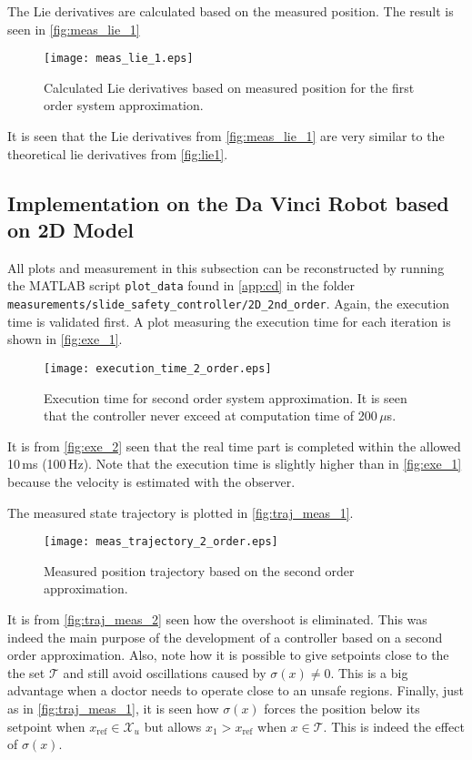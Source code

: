 The Lie derivatives are calculated based on the measured position. The result is seen in \autoref{fig:meas_lie_1}
\begin{figure}[H]
	\center
		\texttt{[image: meas\_lie\_1.eps]}
	\caption{Calculated Lie derivatives based on measured position for the first order system approximation. }
    \label{fig:meas_lie_1}
\end{figure}
It is seen that the Lie derivatives from \autoref{fig:meas_lie_1} are very similar to the theoretical lie derivatives from \autoref{fig:lie1}.
\subsection{Implementation on the Da Vinci Robot based on 2D Model}\label{subsec-implement-2dmodel}
All plots and measurement in this subsection can be reconstructed by running the MATLAB script \texttt{plot\_data} found in \autoref{app:cd} in the folder \texttt{measurements/slide\_safety\_controller/2D\_2nd\_order}. Again, the execution time is validated first. A plot measuring the execution time for each iteration is shown in \autoref{fig:exe_1}.
\begin{figure}[H]
	\center
		\texttt{[image: execution\_time\_2\_order.eps]}
	\caption{Execution time for second order system approximation. It is seen that the controller never exceed at computation time of 200\,$\mu$s.}
	\label{fig:exe_2}
\end{figure}
It is from \autoref{fig:exe_2} seen that the real time part is completed within the allowed 10\,ms (100\,Hz). Note that the execution time is slightly higher than in \autoref{fig:exe_1} because the velocity is estimated with the observer.

The measured state trajectory is plotted in \autoref{fig:traj_meas_1}.
\begin{figure}[H]
	\center
		\texttt{[image: meas\_trajectory\_2\_order.eps]}
	\caption{Measured position trajectory based on the second order approximation.}
    \label{fig:traj_meas_2}
\end{figure}
It is from \autoref{fig:traj_meas_2} seen how the overshoot is eliminated. This was indeed the main purpose of the development of a controller based on a second order approximation. Also, note how it is possible to give setpoints close to the the set $\mathcal{T}$ and still avoid oscillations caused by $\sigma(x)\neq 0$. This is a big advantage when a doctor needs to operate close to an unsafe regions. Finally, just as in \autoref{fig:traj_meas_1}, it is seen how $\sigma(x)$ forces the position below its setpoint when $x_\text{ref} \in \mathcal{X}_u$ but allows $x_1 > x_\text{ref}$ when $x \in \mathcal{T}$. This is indeed the effect of $\sigma(x)$.

